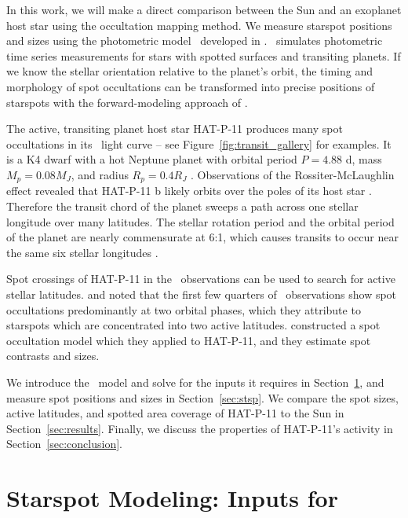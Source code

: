 In this work, we will make a direct comparison between the Sun and an exoplanet host star using the occultation mapping method. We measure starspot positions and sizes using the photometric model \stsp\ developed in \citet{Hebb2017}. \stsp\ simulates photometric time series measurements for stars with spotted surfaces and transiting planets. If we know the stellar orientation relative to the planet's orbit, the timing and morphology of spot occultations can be transformed into precise positions of starspots with the forward-modeling approach of \stsp.

The active, transiting planet host star HAT-P-11 produces many spot occultations in its \kepler\ light curve -- see Figure~\ref{fig:transit_gallery} for examples. It is a K4 dwarf with a hot Neptune planet with orbital period $P = 4.88$ d, mass $M_p = 0.08 M_J$, and radius $R_p = 0.4 R_J$ \citep{Bakos2010}. Observations of the Rossiter-McLaughlin effect revealed that HAT-P-11 b likely orbits over the poles of its host star \citep{Winn2010, Hirano2011, Sanchis-Ojeda2011}. Therefore the transit chord of the planet sweeps a path across one stellar longitude over many latitudes. The stellar rotation period and the orbital period of the planet are nearly commensurate at 6:1, which causes transits to occur near the same six stellar longitudes \citep{Beky2014a}.

Spot crossings of HAT-P-11 in the \kepler\ observations can be used to search for active stellar latitudes. \citet{Sanchis-Ojeda2011} and \citet{Deming2011} noted that the first few quarters of \kepler\ observations show spot occultations predominantly at two orbital phases, which they attribute to starspots which are concentrated into two active latitudes. \cite{Beky2014b} constructed a spot occultation model which they applied to HAT-P-11, and they estimate spot contrasts and sizes.

We introduce the \stsp\ model and solve for the inputs it requires in Section~\ref{sec:inputs}, and measure spot positions and sizes in Section~\ref{sec:stsp}. We compare the spot sizes, active latitudes, and spotted area coverage of HAT-P-11 to the Sun in Section~\ref{sec:results}. Finally, we discuss the properties of HAT-P-11's activity in Section~\ref{sec:conclusion}. 

\section{Starspot Modeling: Inputs for \stsp} \label{sec:inputs}

